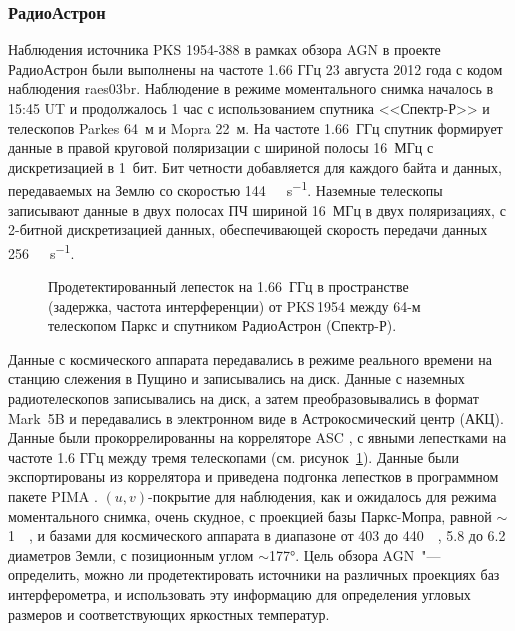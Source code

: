 \subsubsection{РадиоАстрон}

Наблюдения источника PKS 1954-388 в рамках обзора AGN в проекте РадиоАстрон были выполнены на
частоте 1.66 ГГц 23 августа 2012 года с кодом наблюдения raes03br. Наблюдение в режиме моментального
снимка началось в 15:45 UT и продолжалось 1 час с использованием спутника <<Спектр-Р>> и телескопов
Parkes 64~м и Mopra 22~м. На частоте 1.66~ГГц спутник формирует данные в правой круговой поляризации
с шириной полосы 16~МГц с дискретизацией в 1~бит. Бит четности добавляется для каждого байта и
данных, передаваемых на Землю со скоростью \SI{144}{\mega\bit\per\second}. Наземные телескопы
записывают данные в двух полосах ПЧ шириной 16~МГц в двух поляризациях, с 2-битной дискретизацией
данных, обеспечивающей скорость передачи данных \SI{256}{\mega\bit\per\second}.

\begin{figure}[tbh]
\caption{Продетектированный лепесток на 1.66~ГГц в пространстве (задержка, частота интерференции)
от PKS\,1954 между 64-м телескопом Паркс и спутником РадиоАстрон (Спектр-Р).}
\label{fig:pks_1954_fringe}
\end{figure}

Данные с космического аппарата передавались в режиме реального времени на станцию слежения в
Пущино и записывались на диск. Данные с наземных радиотелескопов записывались на диск, а затем
преобразовывались в формат Mark~5B и передавались в электронном виде в Астрокосмический
центр (АКЦ). Данные были прокоррелированны на корреляторе ASC \cite{Kardashev_2013_rus}, с явными
лепестками на частоте 1.6 ГГц между тремя телескопами (см. рисунок~\ref{fig:pks_1954_fringe}).
Данные были экспортированы из коррелятора и приведена подгонка лепестков в программном пакете PIMA
\cite{Petrov_2011}. $(u, v)$-покрытие для наблюдения, как и ожидалось для режима моментального
снимка, очень скудное, с проекцией базы Паркс-Мопра, равной $\sim$\SI{1}{\mega\la}, и базами для
космического аппарата в диапазоне от 403 до \SI{440}{\mega\la}, 5.8 до 6.2 диаметров Земли, с
позиционным углом $\sim$\ang{177}. Цель обзора AGN~"--- определить, можно ли продетектировать
источники на различных проекциях баз интерферометра, и использовать эту информацию для определения
угловых размеров и соответствующих яркостных температур.

